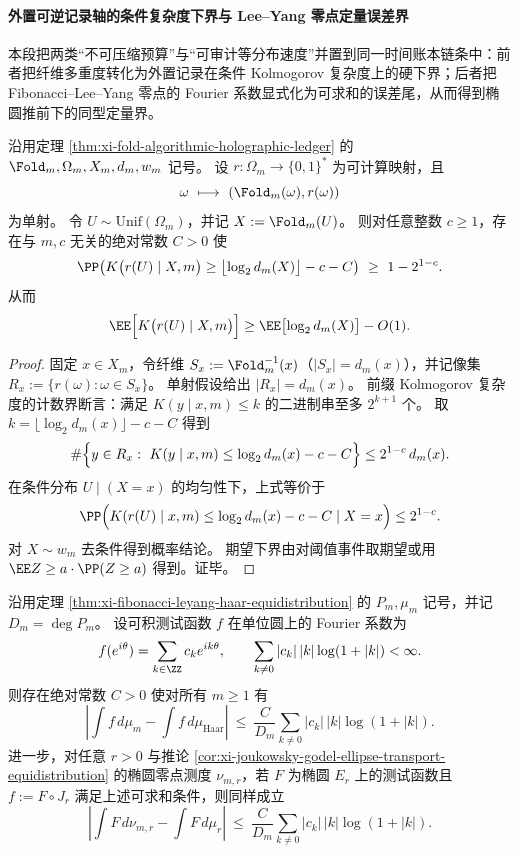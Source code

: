 \paragraph{外置可逆记录轴的条件复杂度下界与 Lee--Yang 零点定量误差界}
本段把两类“不可压缩预算”与“可审计等分布速度”并置到同一时间账本链条中：前者把纤维多重度转化为外置记录在条件 Kolmogorov 复杂度上的硬下界；后者把 Fibonacci--Lee--Yang 零点的 Fourier 系数显式化为可求和的误差尾，从而得到椭圆推前下的同型定量界。

\begin{proposition}[可逆外置记录的条件复杂度障碍]\label{prop:xi-external-record-conditional-K-lb}
沿用定理 \ref{thm:xi-fold-algorithmic-holographic-ledger} 的 \(\Fold_m,\Omega_m,X_m,d_m,w_m\) 记号。
设 \(r:\Omega_m\to\{0,1\}^\ast\) 为可计算映射，且
\[
\omega\ \longmapsto\ (\Fold_m(\omega),r(\omega))
\]
为单射。
令 \(U\sim\mathrm{Unif}(\Omega_m)\)，并记 \(X:=\Fold_m(U)\)。
则对任意整数 \(c\ge 1\)，存在与 \(m,c\) 无关的绝对常数 \(C>0\) 使
\[
\PP\!\left(
K\bigl(r(U)\mid X,m\bigr)
\ge
\bigl\lfloor \log_2 d_m(X)\bigr\rfloor -c-C
\right)\ \ge\ 1-2^{1-c}.
\]
从而
\[
\EE\Bigl[K\bigl(r(U)\mid X,m\bigr)\Bigr]
\ge
\EE\bigl[\log_2 d_m(X)\bigr]-O(1).
\]
\end{proposition}

\begin{proof}
固定 \(x\in X_m\)，令纤维 \(S_x:=\Fold_m^{-1}(x)\)（\(|S_x|=d_m(x)\)），并记像集
\(
R_x:=\{r(\omega):\omega\in S_x\}
\)。
单射假设给出 \(|R_x|=d_m(x)\)。
前缀 Kolmogorov 复杂度的计数界断言：满足 \(K(y\mid x,m)\le k\) 的二进制串至多 \(2^{k+1}\) 个。
取
\(
k=\lfloor\log_2 d_m(x)\rfloor-c-C
\)
得到
\[
\#\Bigl\{y\in R_x:\ K(y\mid x,m)\le \log_2 d_m(x)-c-C\Bigr\}
\le 2^{1-c}\,d_m(x).
\]
在条件分布 \(U\mid(X=x)\) 的均匀性下，上式等价于
\[
\PP\Bigl(K(r(U)\mid x,m)\le \log_2 d_m(x)-c-C\mid X=x\Bigr)\le 2^{1-c}.
\]
对 \(X\sim w_m\) 去条件得到概率结论。
期望下界由对阈值事件取期望或用 \(\EE Z\ge a\cdot \PP(Z\ge a)\) 得到。证毕。
\end{proof}

\begin{theorem}\label{thm:xi-fibonacci-leyang-summable-fourier-error}
沿用定理 \ref{thm:xi-fibonacci-leyang-haar-equidistribution} 的 \(P_m,\mu_m\) 记号，并记 \(D_m=\deg P_m\)。
设可积测试函数 \(f\) 在单位圆上的 Fourier 系数为
\[
f(e^{i\theta})=\sum_{k\in\ZZ} c_k e^{ik\theta},
\qquad
\sum_{k\neq 0}|c_k|\,|k|\log(1+|k|)<\infty.
\]
则存在绝对常数 \(C>0\) 使对所有 \(m\ge 1\) 有
\[
\left|\int f\,d\mu_m-\int f\,d\mu_{\mathrm{Haar}}\right|
\ \le\
\frac{C}{D_m}\sum_{k\neq 0}|c_k|\,|k|\log(1+|k|).
\]
进一步，对任意 \(r>0\) 与推论 \ref{cor:xi-joukowsky-godel-ellipse-transport-equidistribution} 的椭圆零点测度 \(\nu_{m,r}\)，若 \(F\) 为椭圆 \(E_r\) 上的测试函数且 \(f:=F\circ J_r\) 满足上述可求和条件，则同样成立
\[
\left|\int F\,d\nu_{m,r}-\int F\,d\mu_r\right|
\ \le\
\frac{C}{D_m}\sum_{k\neq 0}|c_k|\,|k|\log(1+|k|).
\]
\end{theorem}

